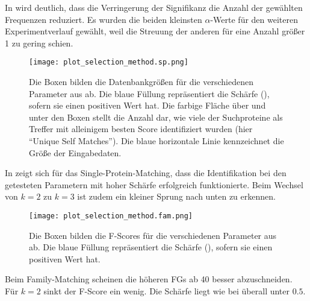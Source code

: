         In  wird deutlich, dass die Verringerung der Signifikanz die Anzahl der gewählten Frequenzen reduziert. Es wurden die beiden kleinsten $\alpha$-Werte für den weiteren Experimentverlauf gewählt, weil die Streuung der anderen für eine Anzahl größer 1 zu gering schien.

        \begin{figure}[H]
            \centering
            \texttt{[image: plot\_selection\_method.sp.png]}
            \caption[Single-Protein-Matching ]{Die Boxen bilden die Datenbankgrößen für die verschiedenen Parameter aus  ab. Die blaue Füllung repräsentiert die Schärfe (), sofern sie einen positiven Wert hat. Die farbige Fläche über und unter den Boxen stellt die Anzahl dar, wie viele der Suchproteine als Treffer mit alleinigem besten Score identifiziert wurden (hier ``Unique Self Matches''). Die blaue horizontale Linie kennzeichnet die Größe der Eingabedaten.}
            \label{fig:selection_method.sp}
        \end{figure}

        In  zeigt sich für das Single-Protein-Matching, dass die Identifikation bei den getesteten Parametern mit hoher Schärfe erfolgreich funktionierte. Beim Wechsel von $k=2$ zu $k=3$ ist zudem ein kleiner Sprung nach unten zu erkennen.

        \begin{figure}[H]
            \centering
            \texttt{[image: plot\_selection\_method.fam.png]}
            \caption[Family-Matching ]{Die Boxen bilden die F-Scores für die verschiedenen Parameter aus  ab. Die blaue Füllung repräsentiert die Schärfe (), sofern sie einen positiven Wert hat.}
            \label{fig:selection_method.fam}
        \end{figure}

        Beim Family-Matching scheinen die höheren \acp{FG} ab 40 besser abzuschneiden. Für $k=2$ sinkt der F-Score ein wenig. Die Schärfe liegt wie bei  überall unter $0.5$.
